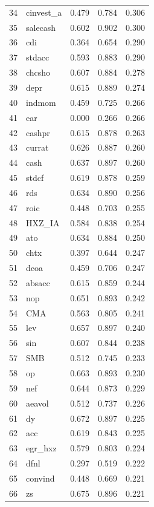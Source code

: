 \begin{footnotesize}
\begin{longtable}{rl|c|c|c}
		34 & cinvest\_a & 0.479 & 0.784 & 0.306 \\ 
		35 & salecash & 0.602 & 0.902 & 0.300 \\ 
		36 & cdi & 0.364 & 0.654 & 0.290 \\ 
		37 & stdacc & 0.593 & 0.883 & 0.290 \\ 
		38 & chcsho & 0.607 & 0.884 & 0.278 \\ 
		39 & depr & 0.615 & 0.889 & 0.274 \\ 
		40 & indmom & 0.459 & 0.725 & 0.266 \\ 
		41 & ear & 0.000 & 0.266 & 0.266 \\ 
		42 & cashpr & 0.615 & 0.878 & 0.263 \\ 
		43 & currat & 0.626 & 0.887 & 0.260 \\ 
		44 & cash & 0.637 & 0.897 & 0.260 \\ 
		45 & stdcf & 0.619 & 0.878 & 0.259 \\ 
		46 & rds & 0.634 & 0.890 & 0.256 \\ 
		47 & roic & 0.448 & 0.703 & 0.255 \\ 
		48 & HXZ\_IA & 0.584 & 0.838 & 0.254 \\ 
		49 & ato & 0.634 & 0.884 & 0.250 \\ 
		50 & chtx & 0.397 & 0.644 & 0.247 \\ 
		51 & dcoa & 0.459 & 0.706 & 0.247 \\ 
		52 & absacc & 0.615 & 0.859 & 0.244 \\ 
		53 & nop & 0.651 & 0.893 & 0.242 \\ 
		54 & CMA & 0.563 & 0.805 & 0.241 \\ 
		55 & lev & 0.657 & 0.897 & 0.240 \\ 
		56 & sin & 0.607 & 0.844 & 0.238 \\ 
		57 & SMB & 0.512 & 0.745 & 0.233 \\ 
		58 & op & 0.663 & 0.893 & 0.230 \\ 
		59 & nef & 0.644 & 0.873 & 0.229 \\ 
		60 & aeavol & 0.512 & 0.737 & 0.226 \\ 
		61 & dy & 0.672 & 0.897 & 0.225 \\ 
		62 & acc & 0.619 & 0.843 & 0.225 \\ 
		63 & egr\_hxz & 0.579 & 0.803 & 0.224 \\ 
		64 & dfnl & 0.297 & 0.519 & 0.222 \\ 
		65 & convind & 0.448 & 0.669 & 0.221 \\ 
		66 & zs & 0.675 & 0.896 & 0.221 \\ 

\end{longtable}
\end{footnotesize}
